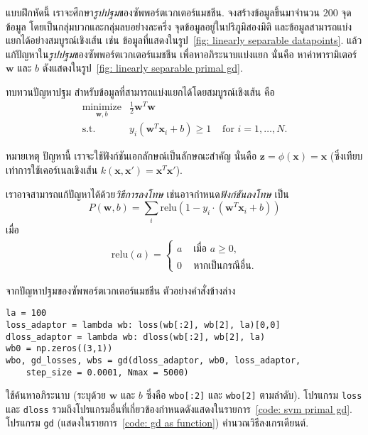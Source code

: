 \begin{Exercise}
	\label{ex: svm primal}
แบบฝึกหัดนี้ เราจะศึกษา\textit{รูปปฐม}ของซัพพอร์ตเวกเตอร์แมชชีน.
จงสร้างข้อมูลขึ้นมาจำนวน $200$ จุดข้อมูล โดยเป็นกลุ่มบวกและกลุ่มลบอย่างละครึ่ง
จุดข้อมูลอยู่ในปริภูมิสองมิติ และข้อมูลสามารถแบ่งแยกได้อย่างสมบูรณ์เชิงเส้น
เช่น ข้อมูลที่แสดงในรูป~\ref{fig: linearly separable datapoints}.
แล้วแก้ปัญหาใน\textit{รูปปฐม}ของซัพพอร์ตเวกเตอร์แมชชีน 
เพื่อหาอภิระนาบแบ่งแยก นั่นคือ หาค่าพารามิเตอร์ $\bm{w}$ และ $b$
ดังแสดงในรูป~\ref{fig: linearly separable primal gd}.

ทบทวนปัญหาปฐม สำหรับข้อมูลที่สามารถแบ่งแยกได้โดยสมบูรณ์เชิงเส้น
คือ
\begin{eqnarray}
\underset{\bm{w}, b}{\mathrm{minimize}} &  \frac{1}{2} \bm{w}^T \bm{w} &
\nonumber \\
\mbox{s.t.} 
& y_i (\bm{w}^T \bm{x}_i + b) \geq 1 & \mbox{ for } i =1, \ldots, N.
\nonumber
\end{eqnarray}

หมายเหตุ ปัญหานี้ เราจะใช้ฟังก์ชันเอกลักษณ์เป็นลักษณะสำคัญ นั่นคือ $\bm{z} = \phi(\bm{x}) = \bm{x}$
(ซึ่งเทียบเท่าการใช้เคอร์เนลเชิงเส้น $k(\bm{x}, \bm{x}') = \bm{x}^T \bm{x}'$).

เราอาจสามารถแก้ปัญหาได้ด้วย\textit{วิธีการลงโทษ}
เช่นอาจกำหนด\textit{ฟังก์ชันลงโทษ} เป็น
\[
P(\bm{w}, b) = \sum_i \mathrm{relu}\left(1 - y_i \cdot (\bm{w}^T \bm{x}_i + b)\right)
\]
เมื่อ 
\begin{eqnarray}
\mathrm{relu}(a) = \left\{ 
\begin{array}{ll}
a & \mbox{ เมื่อ } a \geq 0, \\
0 & \mbox{ หากเป็นกรณีอื่น} .
\end{array}
\right.
\nonumber
\end{eqnarray}

จากปัญหาปฐมของซัพพอร์ตเวกเตอร์แมชชีน ตัวอย่างคำสั่งข้างล่าง
\begin{Verbatim}[fontsize=\small]
la = 100
loss_adaptor = lambda wb: loss(wb[:2], wb[2], la)[0,0]
dloss_adaptor = lambda wb: dloss(wb[:2], wb[2], la)
wb0 = np.zeros((3,1))
wbo, gd_losses, wbs = gd(dloss_adaptor, wb0, loss_adaptor, 
    step_size = 0.0001, Nmax = 5000)
\end{Verbatim}
ใช้ค้นหาอภิระนาบ (ระบุด้วย $\bm{w}$ และ $b$ ซึ่งคือ \verb|wbo[:2]| และ \verb|wbo[2]| ตามลำดับ).
โปรแกรม \verb|loss| และ \verb|dloss| 
รวมถึงโปรแกรมอื่นที่เกี่ยวข้องกำหนดดังแสดงในรายการ~\ref{code: svm primal gd}.
โปรแกรม \verb|gd| (แสดงในรายการ~\ref{code: gd as function}) คำนวณวิธีลงเกรเดียนต์.


\end{Exercise}
